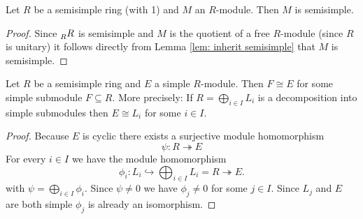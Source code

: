 \begin{prop}
 Let $R$ be a semisimple ring (with 1) and $M$ an $R$-module. Then $M$ is semisimple.
\end{prop}
\begin{proof}
 Since $\prescript{}{R}{R}$ is semisimple and $M$ is the quotient of a free $R$-module (since $R$ is unitary) it follows directly from Lemma \ref{lem: inherit semisimple} that $M$ is semisimple.
\end{proof}


\begin{lem}
 Let $R$ be a semisimple ring and $E$ a simple $R$-module. Then $F \cong E$ for some simple submodule $F \subseteq R$. More precisely: If $R = \bigoplus_{i \in I} L_i$ is a decomposition into simple submodules then $E \cong L_i$ for some $i \in I$.
\end{lem}
\begin{proof}
 Because $E$ is cyclic there exists a surjective module homomorphism
 \[
  \psi \colon R \twoheadrightarrow E
 \]
 For every $i \in I$ we have the module homomorphism
 \[
  \phi_i \colon L_i \hookrightarrow \bigoplus_{i \in I} L_i = R \twoheadrightarrow E.
 \]
 with $\psi = \bigoplus_{i \in I} \phi_i$. Since $\psi \neq 0$ we have $\phi_j \neq 0$ for some $j \in I$. Since $L_j$ and $E$ are both simple $\phi_j$ is already an isomorphism.
\end{proof}


